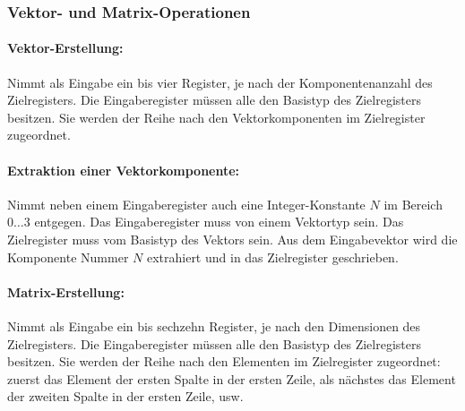 \documentclass[twoside,a4paper,fleqn,12pt]{book}
\begin{document}
\subsubsection{Vektor- und Matrix-Operationen}

\paragraph{Vektor-Erstellung:} Nimmt als Eingabe ein bis vier Register, je nach der Komponentenanzahl des Zielregisters. Die Eingaberegister müssen alle
den Basistyp des Zielregisters besitzen. Sie werden der Reihe nach den Vektorkomponenten im Zielregister zugeordnet.



\paragraph{Extraktion einer Vektorkomponente:} Nimmt neben einem Eingaberegister auch eine Integer-Konstante $N$ im Bereich $0 \dots 3$ entgegen.
Das Eingaberegister muss von einem Vektortyp sein. Das Zielregister muss vom Basistyp des Vektors sein.
Aus dem Eingabevektor wird die Komponente Nummer $N$ extrahiert und in das Zielregister geschrieben.



\paragraph{Matrix-Erstellung:} Nimmt als Eingabe ein bis sechzehn Register, je nach den Dimensionen des Zielregisters. Die Eingaberegister müssen alle
den Basistyp des Zielregisters besitzen. Sie werden der Reihe nach den Elementen im Zielregister zugeordnet: zuerst das Element der ersten Spalte in der ersten Zeile,
als nächstes das Element der zweiten Spalte in der ersten Zeile, usw.
\end{document}
